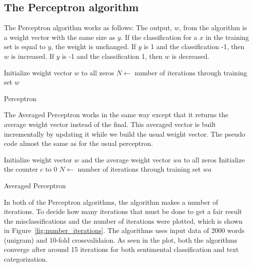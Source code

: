\subsection{The Perceptron algorithm}
The Perceptron algorithm works as follows:
The output, $w$, from the algorithm is a weight vector with the same size as $y$. If the classification for a $x$ in the training set is equal to $y$, the weight is unchanged.
If $y$ is 1 and the classification -1, then $w$ is increased. If $y$ is -1 and the classification 1, then $w$ is decreased. \citep{perceptron_ai}
\begin{algorithm}[h!]
\label{algorithm:perceptron}
 \SetAlgoLined
 Initialize weight vector $w$ to all zeros\;
 $N \leftarrow$ number of iterations through training set\;
 \Return $w$
 \caption{Perceptron}
\end{algorithm}
The Averaged Perceptron works in the same way except that it returns the average weight vector instead of the final.
This averaged vector is built incrementally by updating it while we build the usual weight vector. The pseudo code almost the same as for the usual perceptron.
\begin{algorithm}[h!]
\label{algorithm:averaged_perceptron}
 \SetAlgoLined
 Initialize weight vector $w$ and the average weight vector $wa$ to all zeros\;
 Initialize the counter $c$ to 0\;
 $N \leftarrow$ number of iterations through training set\;
 \Return $wa$
 \caption{Averaged Perceptron}
\end{algorithm}
In both of the Perceptron algorithms, the algorithm makes a number of iterations. To decide how many iterations that must be done to get a fair result the misclassifications and the number of iterations were plotted, which is shown in Figure~\ref{fig:number_iterations}. The algorithms uses input data of 2000 words (unigram) and 10-fold crossvalidaion. As seen in the plot, both the algorithms converge after around 15 iterations for both sentimental classification and text categorization.
